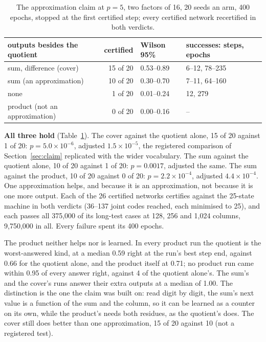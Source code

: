 \documentclass[11pt]{article}
\begin{document}
\begin{table}[t]
\centering
\caption{The approximation claim at $p = 5$, two factors of 16, 20 seeds an arm, 400 epochs, stopped
at the first certified step; every certified network recertified in both verdicts.}
\label{tab:approximation}
\begin{tabular}{lrll}
\toprule
outputs besides the quotient & certified & Wilson 95\% & successes: steps, epochs \\
\midrule
sum, difference (cover) & 15 of 20 & 0.53--0.89 & 6--12, 78--235 \\
sum (an approximation) & 10 of 20 & 0.30--0.70 & 7--11, 64--160 \\
none & 1 of 20 & 0.01--0.24 & 12, 279 \\
product (not an approximation) & 0 of 20 & 0.00--0.16 & -- \\
\bottomrule
\end{tabular}
\end{table}

\textbf{All three hold} (Table~\ref{tab:approximation}). The cover against the quotient alone,
15 of 20 against 1 of 20: $p = 5.0 \times 10^{-6}$, adjusted $1.5 \times 10^{-5}$, the registered
comparison of Section~\ref{sec:claim} replicated with the wider vocabulary. The sum against the
quotient alone, 10 of 20 against 1 of 20: $p = 0.0017$, adjusted the same. The sum against the
product, 10 of 20 against 0 of 20: $p = 2.2 \times 10^{-4}$, adjusted $4.4 \times 10^{-4}$. One
approximation helps, and because it is an approximation, not because it is one more output. Each of
the 26 certified networks certifies against the 25-state machine in both verdicts (36--137 joint
codes reached, each minimised to 25), and each passes all 375{,}000 of its long-test cases at 128,
256 and 1{,}024 columns, 9{,}750{,}000 in all. Every failure spent its 400 epochs.

The product neither helps nor is learned. In every product run the quotient is the worst-answered
kind, at a median 0.59 right at the run's best step end, against 0.66 for the quotient alone, and
the product itself at 0.71; no product run came within 0.95 of every answer right, against 4 of the
quotient alone's. The sum's and the cover's runs answer their extra outputs at a median of 1.00. The
distinction is the one the claim was built on: read digit by digit, the sum's next value is a
function of the sum and the column, so it can be learned as a counter on its own, while the
product's needs both residues, as the quotient's does. The cover still does better than one
approximation, 15 of 20 against 10 (not a registered test).
\end{document}
